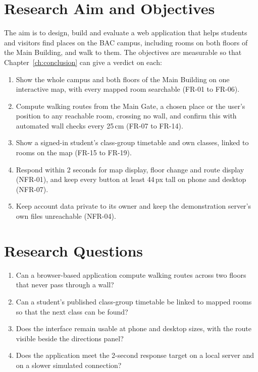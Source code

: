 \documentclass[12pt,a4paper]{report}
\begin{document}
\section{Research Aim and Objectives}
The aim is to design, build and evaluate a web application that helps students and visitors find places on the BAC campus, including rooms on both floors of the Main Building, and walk to them. The objectives are measurable so that Chapter~\ref{ch:conclusion} can give a verdict on each:
\begin{enumerate}
  \item[O1] Show the whole campus and both floors of the Main Building on one interactive map, with every mapped room searchable (FR-01 to FR-06).
  \item[O2] Compute walking routes from the Main Gate, a chosen place or the user's position to any reachable room, crossing no wall, and confirm this with automated wall checks every 25\,cm (FR-07 to FR-14).
  \item[O3] Show a signed-in student's class-group timetable and own classes, linked to rooms on the map (FR-15 to FR-19).
  \item[O4] Respond within 2 seconds for map display, floor change and route display (NFR-01), and keep every button at least 44\,px tall on phone and desktop (NFR-07).
  \item[O5] Keep account data private to its owner and keep the demonstration server's own files unreachable (NFR-04).
\end{enumerate}

\section{Research Questions}
\begin{enumerate}
  \item[RQ1] Can a browser-based application compute walking routes across two floors that never pass through a wall?
  \item[RQ2] Can a student's published class-group timetable be linked to mapped rooms so that the next class can be found?
  \item[RQ3] Does the interface remain usable at phone and desktop sizes, with the route visible beside the directions panel?
  \item[RQ4] Does the application meet the 2-second response target on a local server and on a slower simulated connection?
\end{enumerate}
\end{document}
